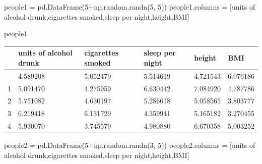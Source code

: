 \documentclass[
  letterpaper,
  DIV=11,
  numbers=noendperiod]{scrreprt}
\newenvironment{Shaded}{\begin{snugshade}}{\end{snugshade}}
\newcommand{\DecValTok}[1]{\textcolor[rgb]{0.68,0.00,0.00}{#1}}
\newcommand{\NormalTok}[1]{\textcolor[rgb]{0.00,0.23,0.31}{#1}}
\newcommand{\OperatorTok}[1]{\textcolor[rgb]{0.37,0.37,0.37}{#1}}
\newcommand{\StringTok}[1]{\textcolor[rgb]{0.13,0.47,0.30}{#1}}
\begin{document}
\begin{Shaded}
\begin{Highlighting}[]
\NormalTok{people1 }\OperatorTok{=}\NormalTok{ pd.DataFrame(}\DecValTok{5}\OperatorTok{+}\NormalTok{np.random.randn(}\DecValTok{5}\NormalTok{, }\DecValTok{5}\NormalTok{))}
\NormalTok{people1.columns }\OperatorTok{=}\NormalTok{ [}\StringTok{\textquotesingle{}units of alcohol drunk\textquotesingle{}}\NormalTok{,}\StringTok{\textquotesingle{}cigarettes smoked\textquotesingle{}}\NormalTok{,}\StringTok{\textquotesingle{}sleep per night\textquotesingle{}}\NormalTok{,}\StringTok{\textquotesingle{}height\textquotesingle{}}\NormalTok{,}\StringTok{\textquotesingle{}BMI\textquotesingle{}}\NormalTok{]}
\end{Highlighting}
\end{Shaded}

\begin{Shaded}
\begin{Highlighting}[]
\NormalTok{people1}
\end{Highlighting}
\end{Shaded}

\begin{longtable}[]{@{}llllll@{}}
\toprule\noalign{}
& units of alcohol drunk & cigarettes smoked & sleep per night & height
& BMI \\
\midrule\noalign{}
\endhead
\bottomrule\noalign{}
\endlastfoot
0 & 4.589208 & 5.052479 & 5.514619 & 4.721543 & 6.076186 \\
1 & 5.091470 & 4.275959 & 6.630442 & 7.084920 & 4.787786 \\
2 & 5.751082 & 4.630197 & 5.286618 & 5.058565 & 3.803777 \\
3 & 6.219418 & 6.131729 & 4.359941 & 5.165182 & 3.270455 \\
4 & 5.930070 & 3.745579 & 4.980880 & 6.670358 & 5.003252 \\
\end{longtable}

\begin{Shaded}
\begin{Highlighting}[]
\NormalTok{people2 }\OperatorTok{=}\NormalTok{ pd.DataFrame(}\DecValTok{5}\OperatorTok{+}\NormalTok{np.random.randn(}\DecValTok{3}\NormalTok{, }\DecValTok{5}\NormalTok{))}
\NormalTok{people2.columns }\OperatorTok{=}\NormalTok{ [}\StringTok{\textquotesingle{}units of alcohol drunk\textquotesingle{}}\NormalTok{,}\StringTok{\textquotesingle{}cigarettes smoked\textquotesingle{}}\NormalTok{,}\StringTok{\textquotesingle{}sleep per night\textquotesingle{}}\NormalTok{,}\StringTok{\textquotesingle{}height\textquotesingle{}}\NormalTok{,}\StringTok{\textquotesingle{}BMI\textquotesingle{}}\NormalTok{]}
\end{Highlighting}
\end{Shaded}
\end{document}
